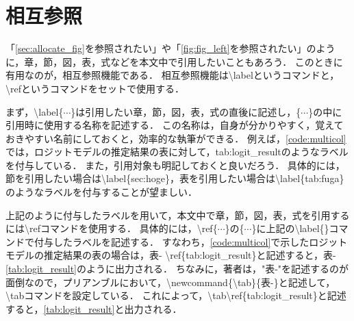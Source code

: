 \section{相互参照}

「\ref{sec:allocate_fig}を参照されたい」や「\fig\ref{fig:fig_left}を参照されたい」のように，章，節，図，表，式などを本文中で引用したいこともあろう．
このときに有用なのが，相互参照機能である．
相互参照機能は\textbackslash labelというコマンドと，\textbackslash refというコマンドをセットで使用する．

まず，\textbackslash label\{$\cdots$\}は引用したい章，節，図，表，式の直後に記述し，\{$\cdots$\}の中に引用時に使用する名称を記述する．
この名称は，自身が分かりやすく，覚えておきやすい名前にしておくと，効率的な執筆ができる．
例えば，\code\ref{code:multicol}では，ロジットモデルの推定結果の表に対して，tab:logit\_resultのようなラベルを付与している．
また，引用対象も明記しておくと良いだろう．
具体的には，節を引用したい場合は\textbackslash label\{sec:hoge\}，表を引用したい場合は\textbackslash label\{tab:fuga\}のようなラベルを付与することが望ましい．

上記のように付与したラベルを用いて，本文中で章，節，図，表，式を引用するには\textbackslash refコマンドを使用する．
具体的には，\textbackslash ref\{$\cdots$\}の\{$\cdots$\}に上記の\textbackslash label\{\}コマンドで付与したラベルを記述する．
すなわち，\code\ref{code:multicol}で示したロジットモデルの推定結果の表の場合は，表- \textbackslash ref\{tab:logit\_result\}と記述すると，表-\ref{tab:logit_result}のように出力される．
ちなみに，著者は，"表-"を記述するのが面倒なので，プリアンブルにおいて，\textbackslash newcommand\{\textbackslash tab\}\{表-\}と記述して，\textbackslash tabコマンドを設定している．
これによって，\textbackslash tab\textbackslash ref\{tab:logit\_result\}と記述すると，\tab\ref{tab:logit_result}と出力される．
